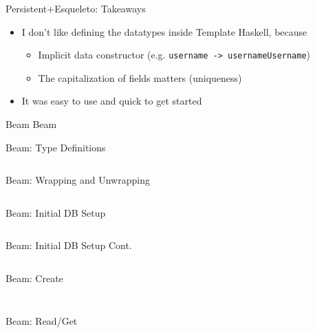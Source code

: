 \documentclass[hyperref={pdfpagelabels=false},12pt]{beamer}
\newcommand{\haskell}[1]{\texttt{#1}}
\newcommand{\pygment}[3]{
  \inputminted[frame=single,framesep=2mm,linenos,fontsize=#1]{#2}{#3}
}
\newcommand{\pygmentLines}[5]{
  \inputminted[frame=single,framesep=2mm,linenos,fontsize=#1,firstline=#2,lastline=#3,autogobble]{#4}{#5}
}
\begin{document}
\begin{frame}{Persistent+Esqueleto: Takeaways}
  \begin{itemize}
    \item I don't like defining the datatypes inside Template Haskell, because
    \begin{itemize}
      \item Implicit data constructor (e.g.
        \haskell{username -> usernameUsername})
      \item The capitalization of fields matters (uniqueness)
    \end{itemize}
    \item It was easy to use and quick to get started
  \end{itemize}
\end{frame}

\begin{frame}{Beam}
  \centering \Huge Beam
\end{frame}

\begin{frame}{Beam: Type Definitions}
  \pygmentLines{\scriptsize}{78}{87}{haskell}{code/beam/src/Person.hs}
\end{frame}

\begin{frame}{Beam: Wrapping and Unwrapping}
  \pygmentLines{\scriptsize}{32}{53}{haskell}{code/beam/src/Person.hs}
\end{frame}

\begin{frame}{Beam: Initial DB Setup}
  \pygmentLines{\scriptsize}{104}{118}{haskell}{code/beam/src/Person.hs}
\end{frame}

\begin{frame}{Beam: Initial DB Setup Cont.}
  \pygmentLines{\scriptsize}{120}{135}{haskell}{code/beam/src/Person.hs}
\end{frame}

\begin{frame}{Beam: Create}
  \pygmentLines{\scriptsize}{147}{152}{haskell}{code/beam/src/Person.hs}
  \pygment{\scriptsize}{sql}{code/sql/insertInto.sql}
\end{frame}

\begin{frame}{Beam: Read/Get}
  \pygmentLines{\scriptsize}{138}{145}{haskell}{code/beam/src/Person.hs}
  \pygment{\scriptsize}{sql}{code/sql/selectWhere.sql}
\end{frame}
\end{document}
